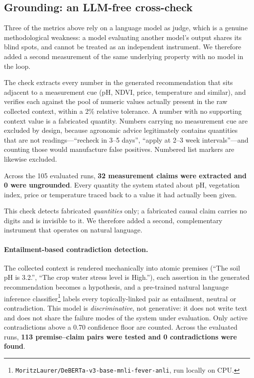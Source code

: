 \documentclass[preprint,12pt]{elsarticle}
\begin{document}
\subsection{Grounding: an LLM-free cross-check}
\label{sec:grounding}

Three of the metrics above rely on a language model as judge, which is a
genuine methodological weakness: a model evaluating another model's output
shares its blind spots, and cannot be treated as an independent
instrument. We therefore added a second measurement of the same underlying
property with no model in the loop.

The check extracts every number in the generated recommendation that sits
adjacent to a measurement cue (pH, NDVI, price, temperature and similar),
and verifies each against the pool of numeric values actually present in
the raw collected context, within a 2\% relative tolerance. A number with
no supporting context value is a fabricated quantity. Numbers carrying no
measurement cue are excluded by design, because agronomic advice
legitimately contains quantities that are not readings---``recheck in
3--5 days'', ``apply at 2--3 week intervals''---and counting those would
manufacture false positives. Numbered list markers are likewise excluded.

Across the 105 evaluated runs, \textbf{32 measurement claims were
extracted and 0 were ungrounded}. Every quantity the system stated about pH, vegetation
index, price or temperature traced back to a value it had actually been
given.

This check detects fabricated \emph{quantities} only; a fabricated causal
claim carries no digits and is invisible to it. We therefore added a
second, complementary instrument that operates on natural language.

\paragraph{Entailment-based contradiction detection.} The collected
context is rendered mechanically into atomic premises (``The soil pH is
3.2.'', ``The crop water stress level is High.''), each assertion in the
generated recommendation becomes a hypothesis, and a pre-trained natural
language inference classifier\footnote{\texttt{MoritzLaurer/DeBERTa-v3-base-mnli-fever-anli},
run locally on CPU.} labels every topically-linked pair as entailment,
neutral or contradiction. This model is \emph{discriminative}, not
generative: it does not write text and does not share the failure modes of
the system under evaluation. Only active contradictions above a 0.70
confidence floor are counted. Across the evaluated runs, \textbf{113
premise--claim pairs were tested and 0 contradictions were found}.
\end{document}
